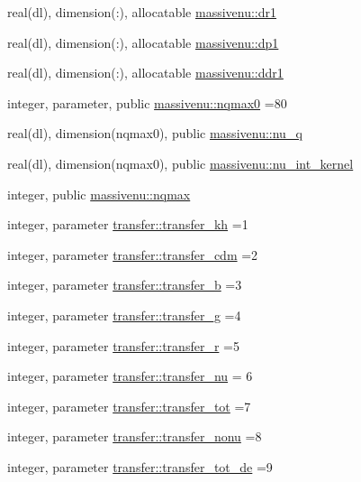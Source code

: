 \begin{DoxyCompactItemize}
real(dl), dimension(\+:), allocatable \mbox{\hyperlink{namespacemassivenu_a73078a1de4febfc2142d1518a0045e06}{massivenu\+::dr1}}
\item 
real(dl), dimension(\+:), allocatable \mbox{\hyperlink{namespacemassivenu_a2bf645ad1caf3996fa724d4351b0b5a8}{massivenu\+::dp1}}
\item 
real(dl), dimension(\+:), allocatable \mbox{\hyperlink{namespacemassivenu_a9d5815d7727b8913cba78eb9fb6d002c}{massivenu\+::ddr1}}
\item 
integer, parameter, public \mbox{\hyperlink{namespacemassivenu_ae4e7d71c09007f613d462d593de26cca}{massivenu\+::nqmax0}} =80
\item 
real(dl), dimension(nqmax0), public \mbox{\hyperlink{namespacemassivenu_a12570e51825f5cec04f3e7d1fffa7702}{massivenu\+::nu\+\_\+q}}
\item 
real(dl), dimension(nqmax0), public \mbox{\hyperlink{namespacemassivenu_addf94ab5a9d895ca27a259f651853eb0}{massivenu\+::nu\+\_\+int\+\_\+kernel}}
\item 
integer, public \mbox{\hyperlink{namespacemassivenu_a95412d3036cd184190c2157292ec7732}{massivenu\+::nqmax}}
\item 
integer, parameter \mbox{\hyperlink{namespacetransfer_a53e222aefb0911649bf35fc879a5f367}{transfer\+::transfer\+\_\+kh}} =1
\item 
integer, parameter \mbox{\hyperlink{namespacetransfer_a9e67898263c714e994816a119937416f}{transfer\+::transfer\+\_\+cdm}} =2
\item 
integer, parameter \mbox{\hyperlink{namespacetransfer_ab15ebb6605b445eaddd657e94abc151b}{transfer\+::transfer\+\_\+b}} =3
\item 
integer, parameter \mbox{\hyperlink{namespacetransfer_a4076f4ea08670377ed92c3a16ced89f0}{transfer\+::transfer\+\_\+g}} =4
\item 
integer, parameter \mbox{\hyperlink{namespacetransfer_a55264fe59289090c8c796b22c71d5937}{transfer\+::transfer\+\_\+r}} =5
\item 
integer, parameter \mbox{\hyperlink{namespacetransfer_a88f1f472755284c745f4f9627f3385f3}{transfer\+::transfer\+\_\+nu}} = 6
\item 
integer, parameter \mbox{\hyperlink{namespacetransfer_a96bc38e4fa7d41872d481db49a3e5f46}{transfer\+::transfer\+\_\+tot}} =7
\item 
integer, parameter \mbox{\hyperlink{namespacetransfer_aa028f75ae9a421f87ff8e2ebbfb88e73}{transfer\+::transfer\+\_\+nonu}} =8
\item 
integer, parameter \mbox{\hyperlink{namespacetransfer_a3ae9f7a69bc80c029fe96b8a1de263b3}{transfer\+::transfer\+\_\+tot\+\_\+de}} =9

\end{DoxyCompactItemize}
